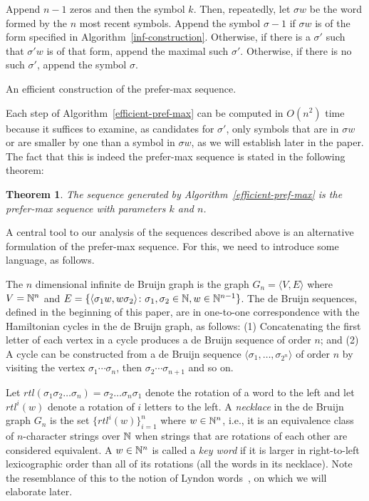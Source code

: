 \documentclass{article} %
\newtheorem{theorem}{Theorem} \newtheorem{proposition}[theorem]{Proposition}
\theoremstyle{definition} \newtheorem{definition}[theorem]{Definition}
\newcommand{\T}[1]{\langle{#1}\rangle} \newcommand{\rr}[2]{R^{#2}({#1})}
\begin{document}
	\begin{algorithm} Append $n-1$ zeros and then the symbol $k$. Then, repeatedly,
		let $\sigma w$ be the word formed by the $n$ most recent symbols. Append the
		symbol $\sigma-1$ if $\sigma w$  is of the form specified in
		Algorithm~\ref{inf-construction}. Otherwise, if there is a  $\sigma'$ such that
		$\sigma'w$ is of that form, append the maximal such $\sigma'$. Otherwise, if
		there is no such $\sigma'$, append the symbol $\sigma$.
		
		\caption{An efficient construction of the prefer-max sequence.}
		\label{efficient-pref-max} \end{algorithm}
	
	Each step of Algorithm~\ref{efficient-pref-max} can be computed in $O(n^2)$
	time because it suffices to examine, as candidates for $\sigma'$, only symbols
	that are in $\sigma w$ or are smaller by one than a symbol in $\sigma w$, as we
	will establish later in the paper. The fact that this is indeed the prefer-max
	sequence is stated in the following theorem:
	
	\begin{theorem} The sequence generated by Algorithm~\ref{efficient-pref-max} is
		the prefer-max sequence with parameters $k$ and $n$. \end{theorem}
	
	
	A central tool to our analysis of the sequences described above is an
	alternative formulation of the prefer-max sequence. For this, we need to
	introduce some language, as follows.
	
	The $n$ dimensional infinite de Bruijn graph is the graph $G_{n}=\T{V,E}$ where
	$V={\mathbb{N}}^n$ and $E=\{ \T{\sigma_1 w, w \sigma_2} \colon \sigma_1,\sigma_2\in\N, w
	\in \N^{n-1}\}$. The de Bruijn sequences, defined in the beginning of this
	paper, are in one-to-one correspondence with the Hamiltonian cycles in the de
	Bruijn graph, as follows: (1) Concatenating the first letter of each vertex in
	a cycle produces a de Bruijn sequence of order $n$; and (2) A cycle can be
	constructed from a de Bruijn sequence $\T{\sigma_1,\dots,\sigma_{2^n}}$ of
	order $n$ by visiting the vertex $\sigma_1\cdots\sigma_n$, then
	$\sigma_2\cdots\sigma_{n+1}$ and so on.
	
	Let $rtl(\sigma_1\sigma_2\dots\sigma_n) = \sigma_2\dots\sigma_n\sigma_1$ denote
	the rotation of a word to the left and let $rtl^i(w)$ denote a rotation of $i$
	letters to the left. A \emph{necklace} in the de Bruijn graph $G_n$ is the set
	$\{rtl^i(w)\}_{i=1}^n$ where $w \in {\mathbb{N}}^n$, i.e., it is an equivalence class of
	$n$-character strings over ${\mathbb{N}}$ when strings that are rotations of each other
	are considered equivalent. A $w\in{\mathbb{N}}^n$ is called a \emph{key word} if it is
	larger in right-to-left lexicographic order than all of its rotations (all the
	words in its necklace).  Note the resemblance of this to the notion of Lyndon
	words~\cite{Lyndon1954}, on which we will elaborate later.
	
\end{document}

